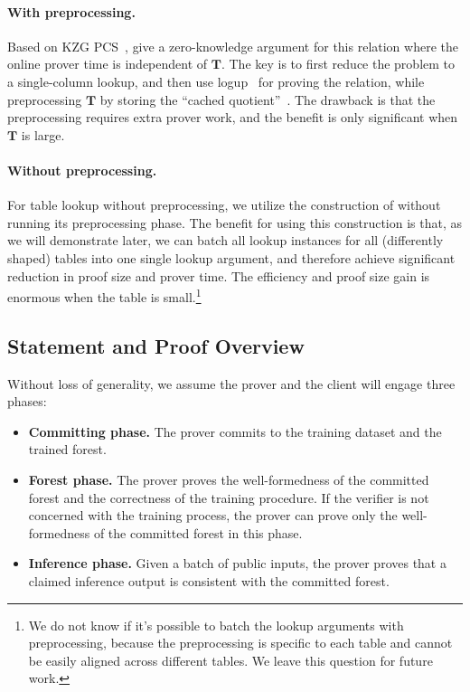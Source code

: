 \paragraph{With preprocessing.}
Based on KZG PCS~\cite{kzg10}, \citet{cq++24} give a zero-knowledge argument for this relation
    where the online prover time is independent of $\mathbf{T}$.
    The key is to first reduce the problem to a single-column lookup, and then
    use logup~\cite{logup22} for proving the relation,
    while preprocessing $\mathbf{T}$ by storing the ``cached quotient''~\cite{cq22}.
    The drawback is that the preprocessing requires extra prover work,
    and the benefit is only significant when $\mathbf{T}$ is large.

\paragraph{Without preprocessing.}
For table lookup without preprocessing,
    we utilize the construction of \cite{cq++24} without running
    its preprocessing phase.
    The benefit for using this construction is that,
    as we will demonstrate later,
    we can batch all lookup instances for all (differently shaped) tables
    into one single lookup argument, and therefore achieve significant 
    reduction in proof size and prover time.
    The efficiency and proof size gain is enormous
    when the table is small.\footnote{
        We do not know if it's possible to batch the lookup arguments with preprocessing, because the preprocessing is specific to each table and cannot be easily aligned across different tables.
        We leave this question for future work.
    }

\subsection{Statement and Proof Overview}

Without loss of generality,
we assume the prover and the client will engage three phases:
\begin{itemize}
    \item \textbf{Committing phase.} The prover commits to the training dataset and the trained forest.
    
    \item \textbf{Forest phase.} The prover proves the well-formedness of the committed forest and the correctness of the training procedure. If the verifier is not concerned with the training process, the prover can prove only the well-formedness of the committed forest in this phase.

    \item \textbf{Inference phase.} Given a batch of public inputs, 
    the prover proves that a claimed inference output is consistent with the committed forest.
\end{itemize}

